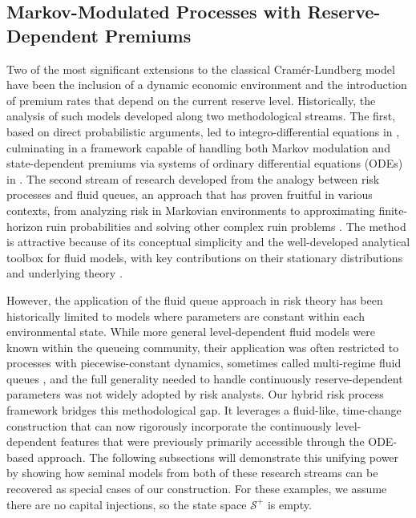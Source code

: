 \documentclass[11pt]{article}
\numberwithin{table}{section}
\numberwithin{figure}{section}
\numberwithin{equation}{section}
\newcommand{\1}{{\mathbf 1}}
\newcommand{\0}{\mat{0}}
\begin{document}
\subsection{Markov-Modulated Processes with Reserve-Dependent Premiums}

Two of the most significant extensions to the classical Cramér-Lundberg model have been the inclusion of a dynamic economic environment and the introduction of premium rates that depend on the current reserve level. Historically, the analysis of such models developed along two methodological streams. The first, based on direct probabilistic arguments, led to integro-differential equations in \cite{Taylor01041980}, culminating in a framework capable of handling both Markov modulation and state-dependent premiums via systems of ordinary differential equations (ODEs) in \cite{asmussen1996phase}. The second stream of research developed from the analogy between risk processes and fluid queues, an approach that has proven fruitful in various contexts, from analyzing risk in Markovian environments \cite{asmussen1989risk} to approximating finite-horizon ruin probabilities \cite{asmussen2002erlangian, badescu2005risk} and solving other complex ruin problems \cite{bladt2019parisian}. The method is attractive because of its conceptual simplicity and the well-developed analytical toolbox for fluid models, with key contributions on their stationary distributions and underlying theory \cite{rogers1994fluid,asmussen1995stationary}.

However, the application of the fluid queue approach in risk theory has been historically limited to models where parameters are constant within each environmental state. While more general level-dependent fluid models were known within the queueing community, their application was often restricted to processes with piecewise-constant dynamics, sometimes called multi-regime fluid queues \cite{horvath2017matrix,akar2021transient}, and the full generality needed to handle continuously reserve-dependent parameters was not widely adopted by risk analysts. Our hybrid risk process framework bridges this methodological gap. It leverages a fluid-like, time-change construction that can now rigorously incorporate the continuously level-dependent features that were previously primarily accessible through the ODE-based approach. The following subsections will demonstrate this unifying power by showing how seminal models from both of these research streams can be recovered as special cases of our construction. For these examples, we assume there are no capital injections, so the state space \(\mathcal{S}^+\) is empty.
\end{document}
